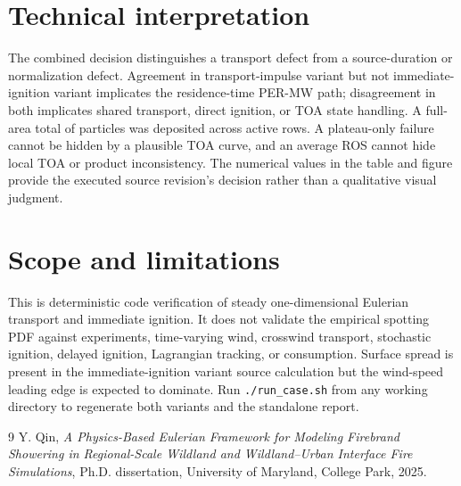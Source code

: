 \section{Technical interpretation}
The combined decision distinguishes a transport defect from a source-duration or
normalization defect. Agreement in transport-impulse variant but not immediate-ignition variant implicates the
residence-time PER-MW path; disagreement in both implicates shared transport,
direct ignition, or TOA state handling. A full-area total of  particles was deposited across  active rows. A plateau-only failure cannot be hidden
by a plausible TOA curve, and an average ROS cannot hide local TOA or product
inconsistency. The numerical values in the table and figure provide the executed
source revision's decision rather than a qualitative visual judgment.

\section{Scope and limitations}
This is deterministic code verification of steady one-dimensional Eulerian
transport and immediate ignition. It does not validate the empirical spotting
PDF against experiments, time-varying wind, crosswind transport, stochastic
ignition, delayed ignition, Lagrangian tracking, or consumption. Surface spread
is present in the immediate-ignition variant source calculation but the wind-speed leading edge is
expected to dominate. Run \texttt{./run\_case.sh} from any working directory to
regenerate both variants and the standalone report.

\begin{thebibliography}{9}
Y. Qin, \emph{A Physics-Based Eulerian Framework for Modeling Firebrand
Showering in Regional-Scale Wildland and Wildland--Urban Interface Fire
Simulations}, Ph.D. dissertation, University of Maryland, College Park, 2025.
\end{thebibliography}
